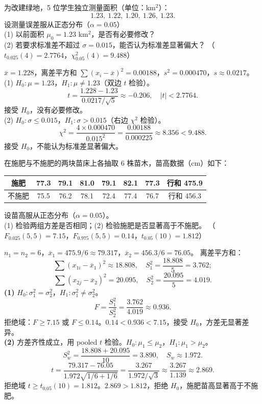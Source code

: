 \documentclass[lang=cn,11pt]{elegantbook}
\begin{document}
\begin{exercise} \label{ex:ht_combo}
为改建绿地，5 位学生独立测量面积（单位：km\(^2\)）：
\[
1.23,\ 1.22,\ 1.20,\ 1.26,\ 1.23.
\]
设测量误差服从正态分布（\(\alpha=0.05\)）\\
(1) 以前面积 \(\mu_0=1.23\) km\(^2\)，是否有必要修改？\\
(2) 若要求标准差不超过 \(\sigma=0.015\)，能否认为标准差显著偏大？
（\(t_{0.025}(4)=2.7764\)，\(\chi^2_{0.05}(4)=9.488\)）
\end{exercise}
\begin{solution}
\(\overline{x}=1.228\)，离差平方和 \(\sum(x_i-\overline{x})^2=0.00188\)，\(s^2=0.000470\)，\(s\approx0.0217\)。\\
(1) \(H_0\colon\mu=1.23\)，\(H_1\colon\mu\neq1.23\)（双边 \(t\) 检验）。
\[
t=\frac{1.228-1.23}{0.0217/\sqrt{5}}\approx-0.206,\quad |t|<2.7764.
\]
接受 \(H_0\)，没有必要修改。\\
(2) \(H_0\colon\sigma\leq0.015\)，\(H_1\colon\sigma>0.015\)（右边 \(\chi^2\) 检验）。
\[
\chi^2=\frac{4\times0.000470}{0.015^2}=\frac{0.00188}{0.000225}\approx8.356<9.488.
\]
接受 \(H_0\)，不能认为标准差显著偏大。
\end{solution}


\begin{exercise} \label{ex:ht_f_pooled}
在施肥与不施肥的两块苗床上各抽取 6 株苗木，苗高数据（cm）如下：
\begin{center}
\begin{tabular}{ccccccc|c}
\toprule
施肥 & 77.3 & 79.1 & 81.0 & 79.1 & 82.1 & 77.3 & 行和 475.9 \\
\midrule
不施肥 & 75.5 & 76.2 & 78.1 & 72.4 & 77.4 & 76.7 & 行和 456.3 \\
\bottomrule
\end{tabular}
\end{center}
设苗高服从正态分布（\(\alpha=0.05\)）。\\
(1) 检验两组方差是否相同；(2) 检验施肥是否显著高于不施肥。
（\(F_{0.025}(5,5)=7.15\)，\(F_{0.975}(5,5)=0.14\)，\(t_{0.05}(10)=1.812\)）
\end{exercise}
\begin{solution}
\(n_1=n_2=6\)，\(\overline{x}_1=475.9/6\approx79.317\)，\(\overline{x}_2=456.3/6=76.05\)。
离差平方和：
\[
\sum(x_{1i}-\overline{x}_1)^2\approx18.808,\quad S_1^2=\frac{18.808}{5}=3.762;
\]
\[
\sum(x_{2j}-\overline{x}_2)^2=20.095,\quad S_2^2=\frac{20.095}{5}=4.019.
\]
\textbf{(1)} \(H_0\colon\sigma_1^2=\sigma_2^2\)，\(H_1\colon\sigma_1^2\neq\sigma_2^2\)。
\[
F=\frac{S_1^2}{S_2^2}=\frac{3.762}{4.019}\approx0.936.
\]
拒绝域：\(F\geq7.15\) 或 \(F\leq0.14\)。\(0.14<0.936<7.15\)，接受 \(H_0\)，方差无显著差异。\\
\textbf{(2)} 方差齐性成立，用 pooled \(t\) 检验。\(H_0\colon\mu_1\leq\mu_2\)，\(H_1\colon\mu_1>\mu_2\)。
\[
S_w^2=\frac{18.808+20.095}{10}=3.890,\quad S_w\approx1.972.
\]
\[
t=\frac{79.317-76.05}{1.972\sqrt{1/6+1/6}}=\frac{3.267}{1.972/\sqrt{3}}\approx\frac{3.267}{1.139}\approx2.869.
\]
拒绝域 \(t\geq t_{0.05}(10)=1.812\)。\(2.869>1.812\)，拒绝 \(H_0\)，施肥苗高显著高于不施肥。
\end{solution}
\end{document}
